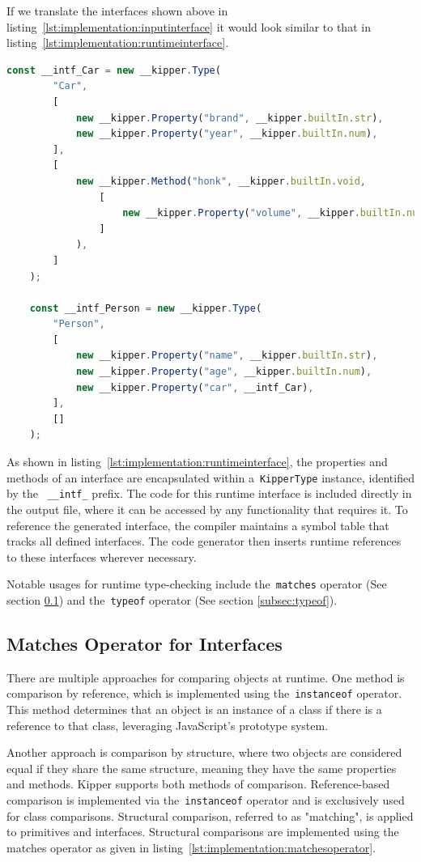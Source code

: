 If we translate the interfaces shown above in listing~\ref{lst:implementation:inputinterface} it would look similar to that in listing~\ref{lst:implementation:runtimeinterface}.

\begin{lstlisting}[language=Typescript,caption=The runtime representation of the previous interfaces,label=lst:implementation:runtimeinterface]
	const __intf_Car = new __kipper.Type(
		"Car",
		[
			new __kipper.Property("brand", __kipper.builtIn.str),
			new __kipper.Property("year", __kipper.builtIn.num),
		],
		[
			new __kipper.Method("honk", __kipper.builtIn.void,
				[
					new __kipper.Property("volume", __kipper.builtIn.num),
				]
			),
		]
	);

	const __intf_Person = new __kipper.Type(
		"Person",
		[
			new __kipper.Property("name", __kipper.builtIn.str),
			new __kipper.Property("age", __kipper.builtIn.num),
			new __kipper.Property("car", __intf_Car),
		],
		[]
	);
\end{lstlisting}

As shown in listing~\ref{lst:implementation:runtimeinterface}, the properties and methods of an interface are encapsulated within a~\lstinline|KipperType| instance, identified by the ~\lstinline|__intf_| prefix. The code for this runtime interface is included directly in the output file, where it can be accessed by any functionality that requires it. To reference the generated interface, the compiler maintains a symbol table that tracks all defined interfaces. The code generator then inserts runtime references to these interfaces wherever necessary.

Notable usages for runtime type-checking include the~\lstinline|matches| operator (See section \ref{subsec:matches}) and the~\lstinline|typeof| operator (See section \ref{subsec:typeof}).

\subsection{Matches Operator for Interfaces}
\label{subsec:matches}

There are multiple approaches for comparing objects at runtime. One method is comparison by reference, which is implemented using the~\lstinline|instanceof| operator. This method determines that an object is an instance of a class if there is a reference to that class, leveraging JavaScript's prototype system.

Another approach is comparison by structure, where two objects are considered equal if they share the same structure, meaning they have the same properties and methods. Kipper supports both methods of comparison. Reference-based comparison is implemented via the~\lstinline|instanceof| operator and is exclusively used for class comparisons. Structural comparison, referred to as "matching", is applied to primitives and interfaces. Structural comparisons are implemented using the matches operator as given in listing~\ref{lst:implementation:matchesoperator}.


